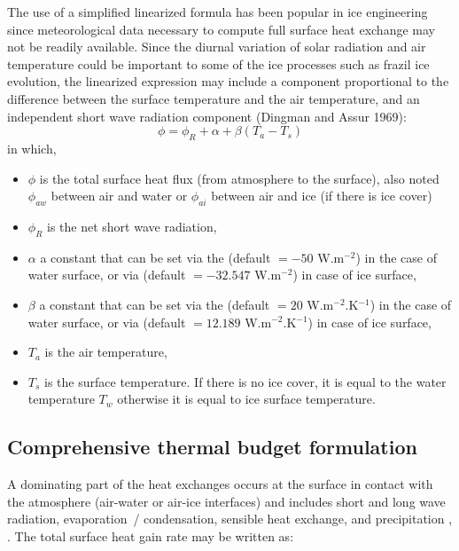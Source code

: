 The use of a simplified linearized formula has been popular in ice engineering since
meteorological data necessary to compute full surface heat exchange may not be readily available.
Since the diurnal variation of solar radiation and air temperature could be important to some of the ice processes such as frazil ice evolution, the linearized expression may include a component proportional to the difference between the surface temperature and the air temperature,
and an independent short wave radiation component (Dingman and Assur 1969):
\begin{equation} \label{eq:philin}
\phi = \phi_R + \alpha + \beta ( T_{a} - T_{s} )
\end{equation}
in which,
\begin{itemize}
	\item $\phi$ is the total surface heat flux (from atmosphere to the surface), also noted $\phi_{aw}$ between air and water or $\phi_{ai}$ between air and ice (if there is ice cover)
	\item $\phi_R$ is the net short wave radiation,
	\item $\alpha$ a constant that can be set via the  (default $=-50$ W.m$^{-2}$) in the case of water surface, or via   (default $=-32.547$ W.m$^{-2}$) in case of ice surface,
	\item $\beta$ a constant that can be set via the  (default $=20$ W.m$^{-2}$.K$^{-1}$) in the case of water surface, or via   (default $=12.189$ W.m$^{-2}$.K$^{-1}$) in case of ice surface,
    \item $T_{a}$ is the air temperature,
    \item $T_{s}$ is the surface temperature. If there is no ice cover, it is equal to the water temperature $T_{w}$ otherwise it is equal to ice surface temperature.
\end{itemize}

\subsection{Comprehensive thermal budget formulation}

A dominating part of the heat exchanges occurs at the surface in contact with the atmosphere (air-water or air-ice interfaces) and includes short and long wave radiation, evaporation~/ condensation, sensible heat exchange, and precipitation \cite{ashton1986river}, \cite{paily1974winter}. The total surface heat gain rate may be written as:

